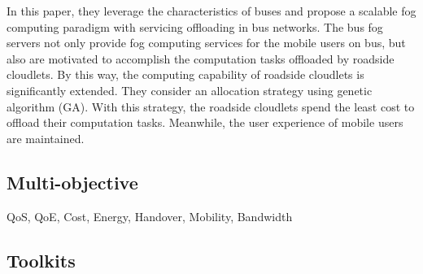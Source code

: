 \cite{ye2016scalable}
In this paper, they leverage the characteristics of buses and propose a scalable fog computing paradigm with servicing offloading in bus networks. The bus fog servers not only provide fog computing services for the mobile users on bus, but also are motivated to accomplish the computation tasks offloaded by roadside cloudlets. By this way, the computing capability of roadside cloudlets is significantly extended. They consider an allocation strategy using genetic algorithm (GA). With this strategy, the roadside cloudlets spend the least cost to offload their computation tasks. Meanwhile, the user experience of mobile users are maintained.





\subsection{Multi-objective}
\label{sec:Multiobjective}
QoS, QoE, Cost, Energy, Handover, Mobility, Bandwidth
\subsection{Toolkits}
\label{sec:Toolkits}



\vfill\pagebreak

